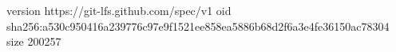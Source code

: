 version https://git-lfs.github.com/spec/v1
oid sha256:a530c950416a239776c97e9f1521ee858ea5886b68d2f6a3e4fe36150ac78304
size 200257
